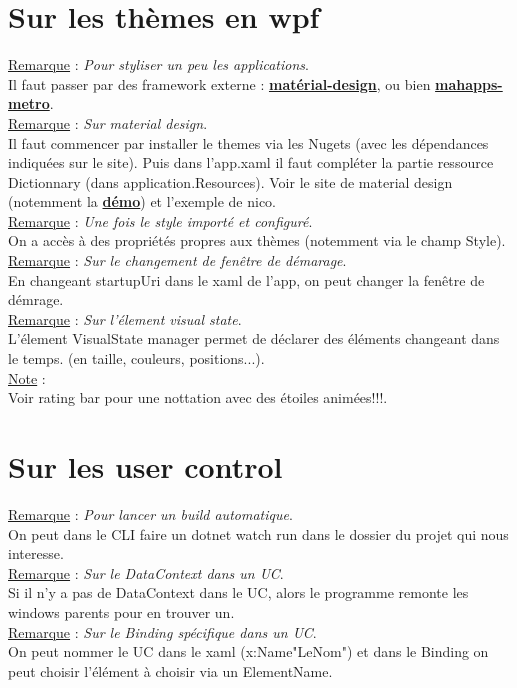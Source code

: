 \documentclass[a4paper,12pt,twoside]{article}
\newcommand{\urlcolor}{magenta}  %
\newcommand{\keycolor}{purple} %
\newcommand{\incode}[1]{{\footnotesize\ttfamily #1}} %
\newcommand{\rem}[2]{\noindent\underline{Remarque} : \textit{#1}.\\ \indent #2}
\newcommand{\note}[1]{\noindent\underline{Note} : \\ \indent #1}
\newcommand{\keyref}[2]{\hypersetup{urlcolor=\keycolor} \href{#1}{\textbf{#2}}\hypersetup{urlcolor=\urlcolor}}
\begin{document}
\section{Sur les thèmes en wpf}

\rem{Pour styliser un peu les applications}{Il faut passer par des framework externe : \keyref{https://material.io/design}{matérial-design}, ou bien \keyref{https://mahapps.com/}{mahapps-metro}.}\\

\rem{Sur material design}{Il faut commencer par installer le themes via les Nugets (avec les dépendances indiquées sur le site). Puis dans l'app.xaml il faut compléter la partie ressource Dictionnary (dans application.Resources). Voir le site de material design (notemment la \keyref{https://github.com/MaterialDesignInXAML/MaterialDesignInXamlToolkit}{démo}) et l'exemple de nico.}\\

\rem{Une fois le style importé et configuré}{On a accès à des propriétés propres aux thèmes (notemment via le champ Style).}\\

\rem{Sur le changement de fenêtre de démarage}{En changeant startupUri dans le xaml de l'app, on peut changer la fenêtre de démrage.}\\

\rem{Sur l'élement visual state}{L'élement VisualState manager permet de déclarer des éléments changeant dans le temps. (en taille, couleurs, positions...).}\\

\note{Voir rating bar pour une nottation avec des étoiles animées!!!.}\\

\section{Sur les user control}

\rem{Pour lancer un build automatique}{On peut dans le CLI faire un \incode{dotnet watch run} dans le dossier du projet qui nous interesse.}\\

\rem{Sur le DataContext dans un UC}{Si il n'y a pas de DataContext dans le UC, alors le programme remonte les windows parents pour en trouver un.}\\

\rem{Sur le Binding spécifique dans un UC}{On peut nommer le UC dans le xaml (x:Name"LeNom") et dans le Binding on peut choisir l'élément à choisir via un ElementName.}\\
\end{document}
